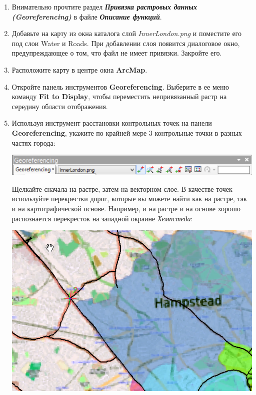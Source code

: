 \documentclass[]{book}
\theoremstyle{definition}
\theoremstyle{definition}
\theoremstyle{definition}
\theoremstyle{remark}
\begin{document}
\begin{enumerate}
\def\labelenumi{\arabic{enumi}.}
\item
  Внимательно прочтите раздел \textbf{\emph{Привязка растровых данных
  (Georeferencing)}} в файле \textbf{\emph{Описание функций}}.
\item
  Добавьте на карту из окна каталога слой \emph{InnerLondon.png} и
  поместите его под слои Water и Roads. При добавлении слоя появится
  диалоговое окно, предупреждающее о том, что файл не имеет привязки.
  Закройте его.
\item
  Расположите карту в центре окна \textbf{ArcMap}.
\item
  Откройте панель инструментов \textbf{Georeferencing}. Выберите в ее
  меню команду \textbf{Fit to Display}, чтобы переместить непривязанный
  растр на середину области отображения.
\item
  Используя инструмент расстановки контрольных точек на панели
  \textbf{Georeferencing}, укажите по крайней мере 3 контрольные точки в
  разных частях города:

  \includegraphics{images/Ex06/image8.png}

  Щелкайте сначала на растре, затем на векторном слое. В качестве точек
  используйте перекрестки дорог, которые вы можете найти как на растре,
  так и на картографической основе. Например, и на растре и на основе
  хорошо распознается перекресток на западной окраине \emph{Хемпстеда}:

  \includegraphics{images/Ex06/image9.png}


\end{enumerate}
\end{document}
